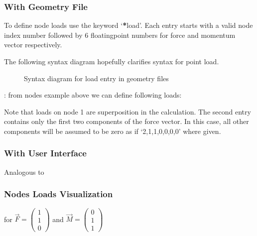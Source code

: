 \documentclass[letterpaper,10pt,english]{sphinxmanual}
\begin{document}
\subsubsection{With Geometry File}
\label{\detokenize{making_a_model:id11}}
To define node loads use the keyword ‘{\color{red}\bfseries{}*}load’. Each entry starts with a valid node index number followed by 6
floating\sphinxhyphen{}point numbers for force and momentum vector respectively.

The following syntax diagram hopefully clarifies syntax for point load.

\begin{figure}[htbp]
\centering
\capstart

\noindent{}
\caption{Syntax diagram for load entry in geometry files}\label{\detokenize{making_a_model:id25}}\end{figure}

:
from nodes example above we can define following loads:

\begin{sphinxVerbatim}[commandchars=\\\{\}]
 
 
\end{sphinxVerbatim}

Note that loads on node 1 are superposition in the calculation.
The second entry contains only the first two components of the force vector.
In this case, all other components will be assumed to be zero as if ‘2,1,1,0,0,0,0’ where given.


\subsubsection{With User Interface}
\label{\detokenize{making_a_model:id14}}
Analogous to {\hyperref[\detokenize{making_a_model:nodes-input}]{}}


\subsubsection{Nodes Loads Visualization}
\label{\detokenize{making_a_model:nodes-loads-visualization}}
for \(\vec{F}= \left(\begin{array}{c} 1 \\ 1 \\ 0 \end{array}\right)\) and
\(\vec{M}= \left(\begin{array}{c} 0 \\ 1 \\ 1 \end{array}\right)\)
\end{document}
